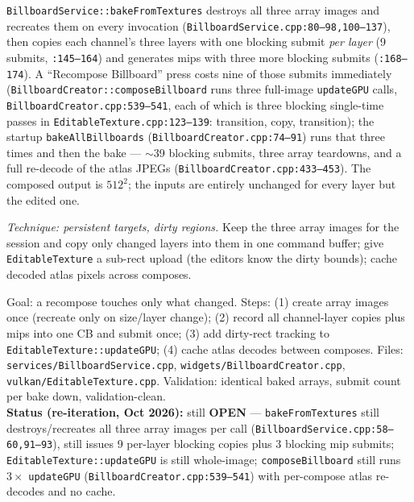\documentclass[11pt,a4paper]{article}
\begin{document}
\texttt{BillboardService::bakeFromTextures} destroys all three array images and
recreates them on every invocation (\texttt{BillboardService.cpp:80--98,100--137}),
then copies each channel's three layers with one blocking submit \emph{per
layer} (9 submits, \texttt{:145--164}) and generates mips with three more
blocking submits (\texttt{:168--174}). A ``Recompose Billboard'' press costs
nine of those submits immediately (\texttt{BillboardCreator::composeBillboard}
runs three full-image \texttt{updateGPU} calls, \texttt{BillboardCreator.cpp:539--541},
each of which is three blocking single-time passes in
\texttt{EditableTexture.cpp:123--139}: transition, copy, transition); the
startup \texttt{bakeAllBillboards} (\texttt{BillboardCreator.cpp:74--91}) runs
that three times and then the bake --- $\sim$39 blocking submits, three array
teardowns, and a full re-decode of the atlas JPEGs
(\texttt{BillboardCreator.cpp:433--453}). The composed output is $512^2$; the
inputs are entirely unchanged for every layer but the edited one.

\textit{Technique: persistent targets, dirty regions.} Keep the three array
images for the session and copy only changed layers into them in one command
buffer; give \texttt{EditableTexture} a sub-rect upload (the editors know the
dirty bounds); cache decoded atlas pixels across composes.

\begin{tcolorbox}[promptbox={Prompt --- H5: in-place billboard updates}]
Goal: a recompose touches only what changed. Steps: (1) create array images
once (recreate only on size/layer change); (2) record all channel-layer copies
plus mips into one CB and submit once; (3) add dirty-rect tracking to
\texttt{EditableTexture::updateGPU}; (4) cache atlas decodes between composes.
Files: \texttt{services/BillboardService.cpp},
\texttt{widgets/BillboardCreator.cpp}, \texttt{vulkan/EditableTexture.cpp}.
Validation: identical baked arrays, submit count per bake down,
validation-clean.
\\ \textbf{Status (re-iteration, Oct 2026):} still \textbf{OPEN} ---
\texttt{bakeFromTextures} still destroys/recreates all three array images per
call (\texttt{BillboardService.cpp:58--60,91--93}), still issues 9 per-layer
blocking copies plus 3 blocking mip submits; \texttt{EditableTexture::updateGPU}
is still whole-image; \texttt{composeBillboard} still runs $3\times$
\texttt{updateGPU} (\texttt{BillboardCreator.cpp:539--541}) with per-compose
atlas re-decodes and no cache.
\end{tcolorbox}
\end{document}
